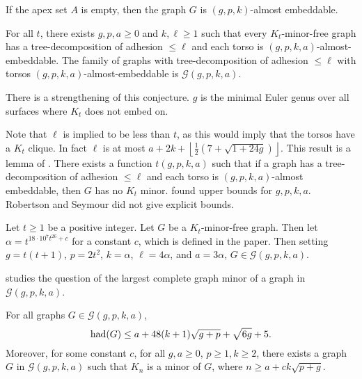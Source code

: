  If the apex set $A$ is empty, then the graph $G$ is $(g, p, k)$-almost embeddable. 

\begin{theorem}\label{thm:gmst}
	For all \(t\), there exists \(g, p, a \geq 0\) and \(k, \ell \geq 1\) such that every \(K_t\)-minor-free graph has a tree-decomposition of adhesion \(\leq \ell\) and each torso is \((g, p, k, a)\)-almost-embeddable. The  family of graphs with tree-decomposition of adhesion $\leq \ell$ with torsos $(g, p, k, a)$-almost-embeddable is \(\mathcal{G}(g, p, k, a)\). 
\end{theorem}
There is a strengthening of this conjecture. $g$ is the minimal Euler genus over all surfaces where $K_t$ does not embed on.

Note that $\ell$ is implied to be less than $t$, as this would imply that the torsos have a $K_t$ clique. In fact $\ell$ is at most $a + 2k + \left\lfloor 
\frac{1}{2} (7 + \sqrt{1 + 24g})
\right\rfloor$. This result is a lemma of \textcite{dujmovicLayeredSeparatorsMinorclosed2017}. 
There exists a function \(t(g, p, k, a)\) such that if a graph has a tree-decomposition of adhesion \(\leq \ell\) and each torso is \((g, p, k, a)\)-almost embeddable, then \(G\) has no \(K_t\) minor. \textcite{kawarabayashiQuicklyExcludingNonplanar2021} found upper bounds for $g, p, k, a$. Robertson and Seymour did not give explicit bounds.

\begin{theorem}
	Let $t \geq 1$ be a positive integer. Let $G$ be a $K_t$-minor-free graph. Then let $\alpha = t^{18 \cdot 10^{7} t^{26} + c}$ for a constant $c$, which is defined in the paper. Then setting $g = t(t+1)$, $p = 2t^2$, $k = \alpha$, $\ell = 4\alpha$, and $a = 3\alpha$, $G \in \mathcal{G}(g,p,k,a)$. 
\end{theorem}

\textcite{joretCompleteGraphMinors2013} studies the question of the largest complete graph minor of a graph in $\mathcal{G}(g, p, k, a)$. 

\begin{theorem}\label{thm:graph_structure_bound_theorem}
	For all graphs \(G \in \mathcal{G}(g, p, k, a)\),
	\[\operatorname{had}(G) \leq a + 48(k + 1)\sqrt{g + p} + \sqrt{6g} + 5.\] Moreover, for some constant $c$, for all $g, a \geq 0$, $p \geq 1, k \geq 2$, there exists a graph $G$ in \(\mathcal{G}(g, p, k, a)\) such that \(K_n\) is a minor of $G$, where \(n \geq a + c k\sqrt{p + g}\).
\end{theorem}